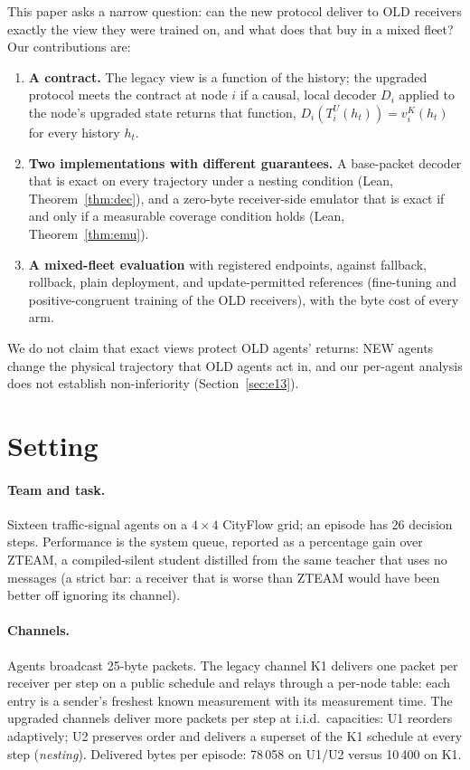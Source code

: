 \documentclass[11pt]{article}
\begin{document}
This paper asks a narrow question: can the new protocol deliver to OLD receivers exactly the view they were trained on, and what does
that buy in a mixed fleet? Our contributions are:
\begin{enumerate}
\item \textbf{A contract.} The legacy view is a function of the history; the upgraded protocol meets the contract at node $i$ if a causal,
local decoder $D_i$ applied to the node's upgraded state returns that function, $D_i(T^U_i(h_t)) = v^K_i(h_t)$ for every history $h_t$.
\item \textbf{Two implementations with different guarantees.} A base-packet decoder that is exact on every trajectory under a nesting
condition (Lean, Theorem~\ref{thm:dec}), and a zero-byte receiver-side emulator that is exact if and only if a measurable coverage
condition holds (Lean, Theorem~\ref{thm:emu}).
\item \textbf{A mixed-fleet evaluation} with registered endpoints, against fallback, rollback, plain deployment, and update-permitted
references (fine-tuning and positive-congruent training of the OLD receivers), with the byte cost of every arm.
\end{enumerate}
We do not claim that exact views protect OLD agents' returns: NEW agents change the physical trajectory that OLD agents act in, and our
per-agent analysis does not establish non-inferiority (Section~\ref{sec:e13}).

\section{Setting}\label{sec:setting}
\paragraph{Team and task.} Sixteen traffic-signal agents on a $4\times4$ CityFlow grid; an episode has 26 decision steps. Performance is
the system queue, reported as a percentage gain over ZTEAM, a compiled-silent student distilled from the same teacher that uses no
messages (a strict bar: a receiver that is worse than ZTEAM would have been better off ignoring its channel).
\paragraph{Channels.} Agents broadcast 25-byte packets. The legacy channel K1 delivers one packet per receiver per step on a public
schedule and relays through a per-node table: each entry is a sender's freshest known measurement with its measurement time. The
upgraded channels deliver more packets per step at i.i.d.\ capacities: U1 reorders adaptively; U2 preserves order and delivers a superset
of the K1 schedule at every step (\emph{nesting}). Delivered bytes per episode: 78\,058 on U1/U2 versus 10\,400 on K1.
\end{document}
